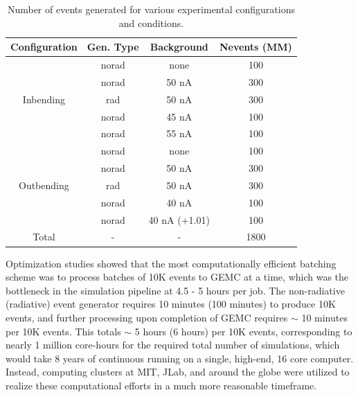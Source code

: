     \fi
    

    \begin{table}[htb]
        \centering
        \begin{tabular}{c|ccc}
            \textbf{Configuration} & \textbf{Gen. Type} & \textbf{Background} & \textbf{Nevents (MM)} \\ \hline
                & norad & none & 100 \\
                & norad & 50 nA & 300 \\
            Inbending & rad & 50 nA & 300 \\
                & norad & 45 nA & 100 \\
                & norad & 55 nA & 100 \\ \hline
                & norad & none & 100 \\
                & norad &  50 nA & 300 \\
            Outbending & rad & 50 nA & 300 \\
                 & norad & 40 nA & 100 \\
             & norad & 40 nA (+1.01) & 100 \\
            \hline
            Total & - & - & 1800 \\
        \end{tabular}
    \caption[Distribution of Generated Events by Configuration]{Number of events generated for various experimental configurations and conditions.} %
    \label{table:Generated_Data}
    \end{table}


    Optimization studies showed that the most computationally efficient batching scheme was to process batches of 10K events to GEMC at a time, which was the bottleneck in the simulation pipeline at 4.5 - 5 hours per job. The non-radiative (radiative) event generator requires 10 minutes (100 minutes) to produce 10K events, and further processing upon completion of GEMC requires $\sim$ 10 minutes per 10K events. This totals $\sim$ 5 hours (6 hours) per 10K events, corresponding to nearly 1 million core-hours for the required total number of simulations, which would take 8 years of continuous running on a single, high-end, 16 core computer. Instead, computing clusters at MIT, JLab, and around the globe were utilized to realize these computational efforts in a much more reasonable timeframe. 
    









